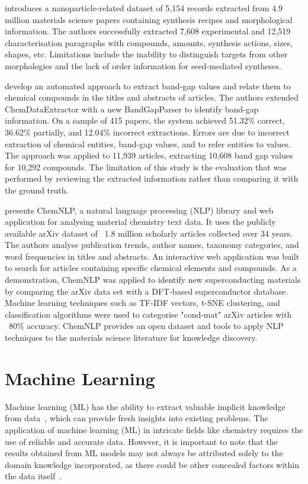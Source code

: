 \cite{cruse2022text} introduces a nanoparticle-related dataset of 5,154 records extracted from 4.9 million materials science papers containing synthesis recipes and morphological information.
The authors successfully extracted 7,608 experimental and 12,519 characterisation paragraphs with compounds, amounts, synthesis actions, sizes, shapes, etc.
Limitations include the inability to distinguish targets from other morphologies and the lack of order information for seed-mediated syntheses.

\cite{ghosh2022band} develop an automated approach to extract band-gap values and relate them to chemical compounds in the titles and abstracts of articles.
The authors extended ChemDataExtractor with a new BandGapParser to identify band-gap information.
On a sample of 415 papers, the system achieved 51.32\% correct, 36.62\% partially, and 12.04\% incorrect extractions.
Errors are due to incorrect extraction of chemical entities, band-gap values, and to refer entities to values.
The approach was applied to 11,939 articles, extracting 10,608 band gap values for 10,292 compounds.
The limitation of this study is the evaluation that was performed by reviewing the extracted information rather than comparing it with the ground truth.

\cite{choudhary2023chemnlp} presents ChemNLP, a natural language processing (NLP) library and web application for analysing material chemistry text data.
It uses the publicly available arXiv dataset of ~1.8 million scholarly articles collected over 34 years.
The authors analyse publication trends, author names, taxonomy categories, and word frequencies in titles and abstracts.
An interactive web application was built to search for articles containing specific chemical elements and compounds.
As a demonstration, ChemNLP was applied to identify new superconducting materials by comparing the arXiv data set with a DFT-based superconductor database.
Machine learning techniques such as TF-IDF vectors, t-SNE clustering, and classification algorithms were used to categorise "cond-mat" arXiv articles with ~80\% accuracy.
ChemNLP provides an open dataset and tools to apply NLP techniques to the materials science literature for knowledge discovery.

\section{Machine Learning}

Machine learning (ML) has the ability to extract valuable implicit knowledge from data~\cite{keith2021combining}, which can provide fresh insights into existing problems.
The application of machine learning (ML) in intricate fields like chemistry requires the use of reliable and accurate data. 
However, it is important to note that the results obtained from ML models may not always be attributed solely to the domain knowledge incorporated, as there could be other concealed factors within the data itself~\cite{keith2021combining}.


